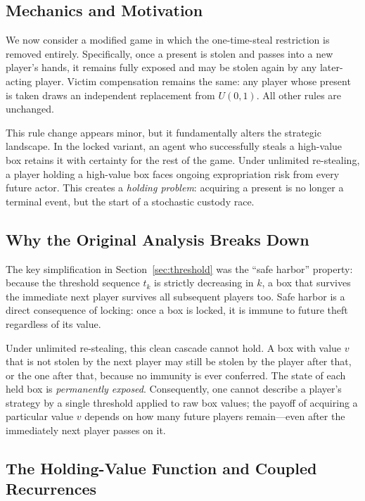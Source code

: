 \documentclass{article}
\begin{document}
\subsection{Mechanics and Motivation}

We now consider a modified game in which the one-time-steal restriction is removed entirely.
Specifically, once a present is stolen and passes into a new player's hands, it remains fully exposed and may be stolen again by any later-acting player.
Victim compensation remains the same: any player whose present is taken draws an independent replacement from $U(0,1)$.
All other rules are unchanged.

This rule change appears minor, but it fundamentally alters the strategic landscape.
In the locked variant, an agent who successfully steals a high-value box retains it with certainty for the rest of the game.
Under unlimited re-stealing, a player holding a high-value box faces ongoing expropriation risk from every future actor.
This creates a \emph{holding problem}: acquiring a present is no longer a terminal event, but the start of a stochastic custody race.

\subsection{Why the Original Analysis Breaks Down}

The key simplification in Section~\ref{sec:threshold} was the ``safe harbor'' property: because the threshold sequence $t_k$ is strictly decreasing in $k$, a box that survives the immediate next player survives all subsequent players too.
Safe harbor is a direct consequence of locking: once a box is locked, it is immune to future theft regardless of its value.

Under unlimited re-stealing, this clean cascade cannot hold.
A box with value $v$ that is not stolen by the next player may still be stolen by the player after that, or the one after that, because no immunity is ever conferred.
The state of each held box is \emph{permanently exposed}.
Consequently, one cannot describe a player's strategy by a single threshold applied to raw box values; the payoff of acquiring a particular value $v$ depends on how many future players remain—even after the immediately next player passes on it.

\subsection{The Holding-Value Function and Coupled Recurrences}
\end{document}
